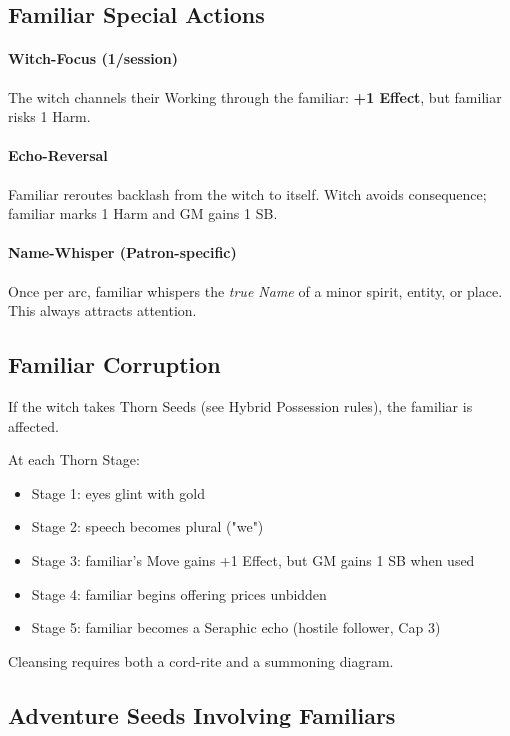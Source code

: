 \documentclass[11pt]{book}
\begin{document}
\subsection{Familiar Special Actions}

\paragraph{Witch-Focus (1/session)}  
The witch channels their Working through the familiar:  
\textbf{+1 Effect}, but familiar risks 1 Harm.

\paragraph{Echo-Reversal}  
Familiar reroutes backlash from the witch to itself.  
Witch avoids consequence; familiar marks 1 Harm and GM gains 1 SB.

\paragraph{Name-Whisper (Patron-specific)}  
Once per arc, familiar whispers the \emph{true Name} of a minor spirit, entity, or place.  
This always attracts attention.

\subsection{Familiar Corruption}

If the witch takes Thorn Seeds (see Hybrid Possession rules), the familiar is affected.

At each Thorn Stage:

\begin{itemize}[leftmargin=1.5em]
    \item Stage 1: eyes glint with gold  
    \item Stage 2: speech becomes plural ("we")  
    \item Stage 3: familiar's Move gains +1 Effect, but GM gains 1 SB when used  
    \item Stage 4: familiar begins offering prices unbidden  
    \item Stage 5: familiar becomes a Seraphic echo (hostile follower, Cap 3)  
\end{itemize}

Cleansing requires both a cord-rite and a summoning diagram.

\subsection{Adventure Seeds Involving Familiars}
\end{document}
